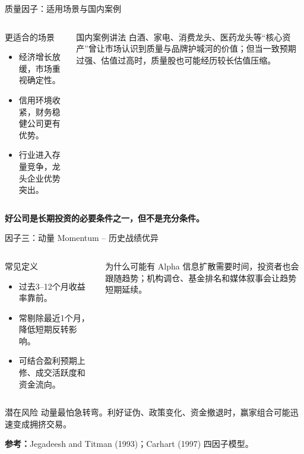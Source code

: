 \documentclass[UTF8,aspectratio=169,11pt]{ctexbeamer}
\newcommand{\source}[1]{\vfill{\scriptsize\color{aqgray}\textbf{参考：}#1}}
\begin{document}
\begin{frame}{质量因子：适用场景与国内案例}
\begin{columns}[T,totalwidth=\textwidth]
\begin{greenbox}{更适合的场景}
\small
\begin{itemize}
\item 经济增长放缓，市场重视确定性。
\item 信用环境收紧，财务稳健公司更有优势。
\item 行业进入存量竞争，龙头企业优势突出。
\end{itemize}
\end{greenbox}
\begin{casebox}{国内案例讲法}
\small
白酒、家电、消费龙头、医药龙头等“核心资产”曾让市场认识到质量与品牌护城河的价值；但当一致预期过强、估值过高时，质量股也可能经历较长估值压缩。
\end{casebox}
\end{columns}
\vspace{0.25cm}
\begin{center}\Large \textbf{好公司是长期投资的必要条件之一，但不是充分条件。}\end{center}
\end{frame}

\begin{frame}{因子三：动量 Momentum -- 历史战绩优异}
\begin{columns}[T,totalwidth=\textwidth]
\begin{keybox}{常见定义}
\small
\begin{itemize}
\item 过去3--12个月收益率靠前。
\item 常剔除最近1个月，降低短期反转影响。
\item 可结合盈利预期上修、成交活跃度和资金流向。
\end{itemize}
\end{keybox}
\begin{casebox}{为什么可能有 Alpha}
\small
信息扩散需要时间，投资者也会跟随趋势；机构调仓、基金排名和媒体叙事会让趋势短期延续。
\end{casebox}
\end{columns}
\begin{riskbox}{潜在风险}
动量最怕急转弯。利好证伪、政策变化、资金撤退时，赢家组合可能迅速变成拥挤交易。
\end{riskbox}
\source{Jegadeesh and Titman (1993)；Carhart (1997) 四因子模型。}
\end{frame}
\end{document}
